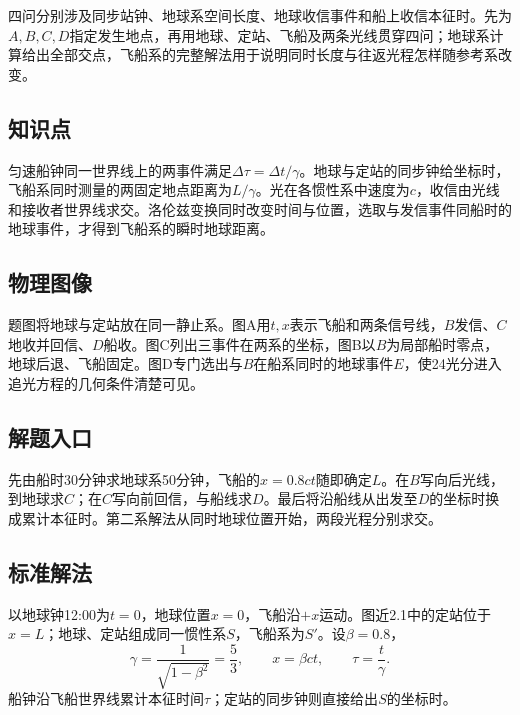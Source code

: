 \documentclass[UTF8,fontset=fandol,a4paper,11pt]{ctexart}
\begin{document}
四问分别涉及同步站钟、地球系空间长度、地球收信事件和船上收信本征时。先为$A,B,C,D$指定发生地点，再用地球、定站、飞船及两条光线贯穿四问；地球系计算给出全部交点，飞船系的完整解法用于说明同时长度与往返光程怎样随参考系改变。



\subsection*{知识点}

匀速船钟同一世界线上的两事件满足$\Delta\tau=\Delta t/\gamma$。地球与定站的同步钟给坐标时，飞船系同时测量的两固定地点距离为$L/\gamma$。光在各惯性系中速度为$c$，收信由光线和接收者世界线求交。洛伦兹变换同时改变时间与位置，选取与发信事件同船时的地球事件，才得到飞船系的瞬时地球距离。



\subsection*{物理图像}

题图将地球与定站放在同一静止系。图A用$t,x$表示飞船和两条信号线，$B$发信、$C$地收并回信、$D$船收。图C列出三事件在两系的坐标，图B以$B$为局部船时零点，地球后退、飞船固定。图D专门选出与$B$在船系同时的地球事件$E$，使24光分进入追光方程的几何条件清楚可见。



\subsection*{解题入口}

先由船时30分钟求地球系50分钟，飞船的$x=0.8ct$随即确定$L$。在$B$写向后光线，到地球求$C$；在$C$写向前回信，与船线求$D$。最后将沿船线从出发至$D$的坐标时换成累计本征时。第二系解法从同时地球位置开始，两段光程分别求交。



\subsection*{标准解法}


以地球钟12:00为$t=0$，地球位置$x=0$，飞船沿$+x$运动。图近2.1中的定站位于$x=L$；地球、定站组成同一惯性系$S$，飞船系为$S'$。设$\beta=0.8$，
\[
\gamma=\frac1{\sqrt{1-\beta^2}}=\frac53,\qquad
x=\beta ct,\qquad \tau=\frac t\gamma.
\]
船钟沿飞船世界线累计本征时间$\tau$；定站的同步钟则直接给出$S$的坐标时。
\end{document}
